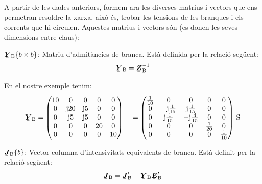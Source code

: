 A partir de les dades anteriors, formem ara les diverses matrius i
vectors que ens permetran resoldre la xarxa, aix\`{o} \'{e}s, trobar les
tensions de les branques i els corrents que hi circulen. Aquestes
matrius i vectors s\'{o}n (es donen les seves dimensions entre claus):

\begin{list}{}
{\setlength{\labelwidth}{20mm} \setlength{\leftmargin}{22mm} \setlength{\labelsep}{2mm}}
   \item[$\mcmplx{Y}\ped{B}\{b\times b\}$:] Matriu d'admit\`{a}ncies de branca. Est\`{a} definida per la relaci\'{o} seg\"{u}ent:
   \begin{equation}
      \mcmplx{Y}\ped{B} = \mcmplx{Z}\ped{B}^{-1}
   \end{equation}

   En el nostre exemple tenim:
   \[
      \mcmplx{Y}\ped{B} = \begin{pmatrix}
            10 & 0 & 0 & 0 & 0 \\
            0 & \ju 20 & \ju 5 & 0 & 0 \\
            0 & \ju 5 & \ju 5 & 0 & 0 \\
            0 & 0 & 0 & 20 & 0 \\
            0 & 0 & 0 & 0 & 10
      \end{pmatrix} ^{-1} =
      \begin{pmatrix}
            \frac{1}{10} & 0 & 0 & 0 & 0 \\
            0 & -\ju\frac{1}{15} & \ju\frac{1}{15} & 0 & 0 \\
            0 & \ju\frac{1}{15} & -\ju\frac{4}{15} & 0 & 0 \\
            0 & 0 & 0 & \frac{1}{20} & 0 \\
            0 & 0 & 0 & 0 & \frac{1}{10}
      \end{pmatrix}\unit{S}
   \]

   \item[$\mcmplx{J}\ped{B}\{b\}$:] Vector columna d'intensivitats equivalents de branca. Est\`{a} definit per la relaci\'{o} seg\"{u}ent:
   \begin{equation}
      \mcmplx{J}\ped{B} = \mcmplx{J}'\ped{B}  + \mcmplx{Y}\ped{B} \mcmplx{E}'\ped{B}
   \end{equation}


\end{list}
